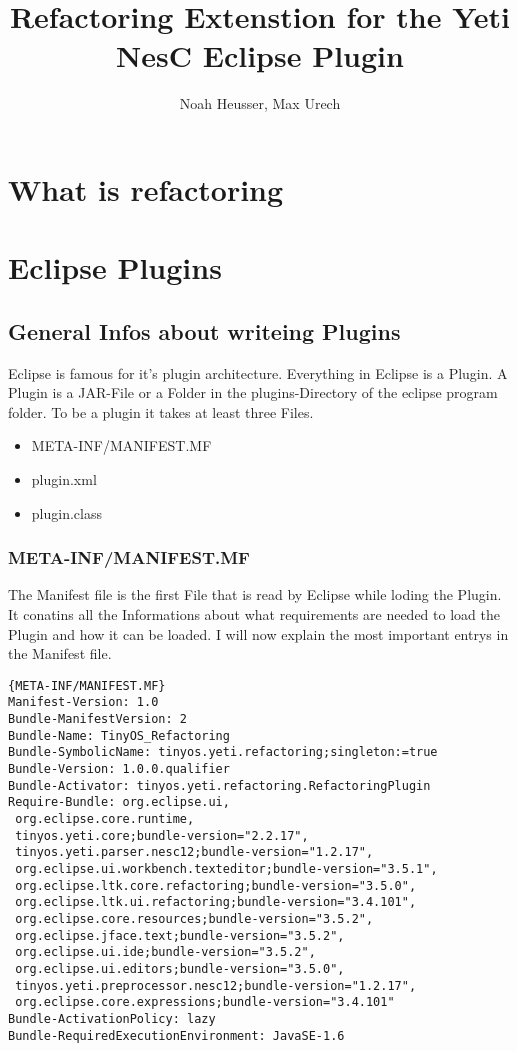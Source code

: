 \documentclass[a4paper,10pt]{report}
\title{Refactoring Extenstion for the Yeti NesC Eclipse Plugin}
\author{Noah Heusser, Max Urech}
\begin{document}
\maketitle

\begin{abstract}
\end{abstract}

\chapter{What is refactoring}

\chapter{Eclipse Plugins}
\section{General Infos about writeing Plugins}
Eclipse is famous for it's plugin architecture. Everything in Eclipse is a Plugin. A Plugin is a JAR-File or a Folder in the plugins-Directory of the eclipse program folder.
To be a plugin it takes at least three Files.
\begin{itemize}
  \item META-INF/MANIFEST.MF
  \item plugin.xml
  \item plugin.class
\end{itemize}

\subsection{META-INF/MANIFEST.MF}
The Manifest file is the first File that is read by Eclipse while loding the Plugin. It conatins all the Informations about what requirements 
are needed to load the Plugin and how it can be loaded. I will now explain the most important entrys in the Manifest file.

\begin{lstlisting}[caption=MANIFEST]{META-INF/MANIFEST.MF}
Manifest-Version: 1.0
Bundle-ManifestVersion: 2
Bundle-Name: TinyOS_Refactoring
Bundle-SymbolicName: tinyos.yeti.refactoring;singleton:=true
Bundle-Version: 1.0.0.qualifier
Bundle-Activator: tinyos.yeti.refactoring.RefactoringPlugin
Require-Bundle: org.eclipse.ui,
 org.eclipse.core.runtime,
 tinyos.yeti.core;bundle-version="2.2.17",
 tinyos.yeti.parser.nesc12;bundle-version="1.2.17",
 org.eclipse.ui.workbench.texteditor;bundle-version="3.5.1",
 org.eclipse.ltk.core.refactoring;bundle-version="3.5.0",
 org.eclipse.ltk.ui.refactoring;bundle-version="3.4.101",
 org.eclipse.core.resources;bundle-version="3.5.2",
 org.eclipse.jface.text;bundle-version="3.5.2",
 org.eclipse.ui.ide;bundle-version="3.5.2",
 org.eclipse.ui.editors;bundle-version="3.5.0",
 tinyos.yeti.preprocessor.nesc12;bundle-version="1.2.17",
 org.eclipse.core.expressions;bundle-version="3.4.101"
Bundle-ActivationPolicy: lazy
Bundle-RequiredExecutionEnvironment: JavaSE-1.6
\end{lstlisting}
\end{document}
